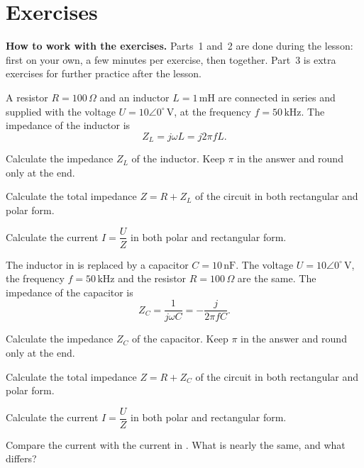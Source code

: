 
\section{Exercises}
\label{c16:sec:uppgifter}

\begin{aside}
\textbf{How to work with the exercises.} Parts~1 and~2 are done during the lesson: first on your
own, a few minutes per exercise, then together. Part~3 is extra exercises for further practice
after the lesson.

\end{aside}


A resistor $R = 100\,\Omega$ and an inductor $L = 1\,\text{mH}$ are connected in series and
supplied with the voltage $U = 10\angle 0^{\circ}\,\text{V}$, at the frequency
$f = 50\,\text{kHz}$. The impedance of the inductor is
\[
  Z_L = j\omega L = j2\pi f L.
\]
\begin{parts}
  \item Calculate the impedance $Z_L$ of the inductor. Keep $\pi$ in the answer and round only at
    the end.
  \item Calculate the total impedance $Z = R + Z_L$ of the circuit in both rectangular and polar
    form.
  \item Calculate the current $I = \dfrac{U}{Z}$ in both polar and rectangular form.
\end{parts}

The inductor in  is replaced by a capacitor $C = 10\,\text{nF}$. The voltage
$U = 10\angle 0^{\circ}\,\text{V}$, the frequency $f = 50\,\text{kHz}$ and the resistor
$R = 100\,\Omega$ are the same. The impedance of the capacitor is
\[
  Z_C = \frac{1}{j\omega C} = -\frac{j}{2\pi f C}.
\]
\begin{parts}
  \item Calculate the impedance $Z_C$ of the capacitor. Keep $\pi$ in the answer and round only at
    the end.
  \item Calculate the total impedance $Z = R + Z_C$ of the circuit in both rectangular and polar
    form.
  \item Calculate the current $I = \dfrac{U}{Z}$ in both polar and rectangular form.
  \item Compare the current with the current in . What is nearly the same, and what
    differs?
\end{parts}

